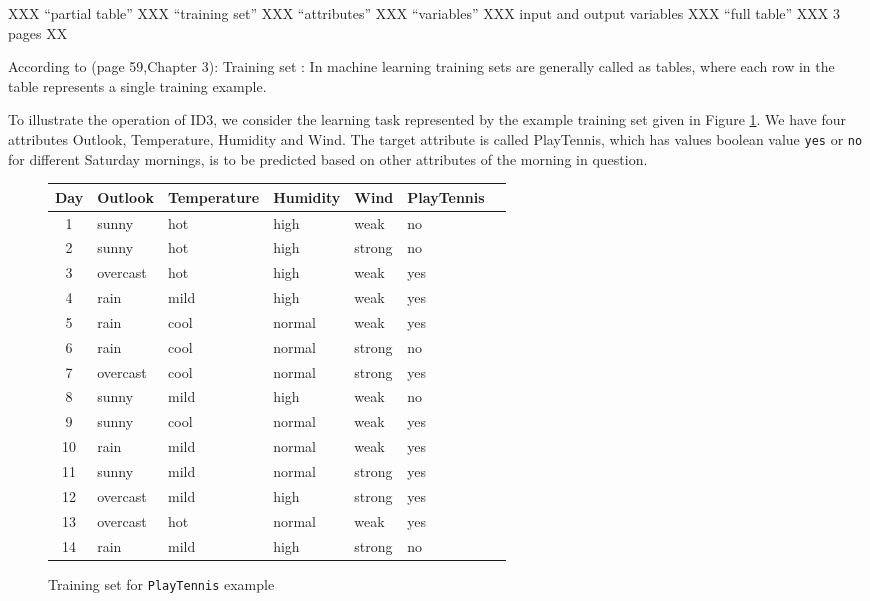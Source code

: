 \documentclass{report}
\begin{document}
XXX ``partial table'' XXX ``training set'' XXX ``attributes'' XXX ``variables'' XXX input and output variables XXX ``full table'' XXX 3 pages XX


According to \cite{Mitchell1997MachineLearning}(page 59,Chapter 3): Training set : In machine learning training sets are generally called as tables, where each row in the table represents a single training example. 

To illustrate the operation of ID3, we consider the learning task represented by the example training set given in Figure \ref{fig:trainingplaytennis}. We have four attributes Outlook, Temperature, Humidity and Wind. The target attribute is called PlayTennis, which has values boolean value \texttt{yes} or \texttt{no} for different Saturday mornings, is to be predicted based on other attributes of the morning in question.
\begin{figure}[h]
  \centering
  \begin{tabular}{|c|l|l|l|l|l|l|}
    \hline
    Day & Outlook & Temperature & Humidity & Wind & PlayTennis\\
    \hline
    1 & sunny & hot & high & weak & no
    \\\hline
    2 & sunny & hot & high & strong & no
    \\\hline
    3 & overcast & hot & high & weak & yes
    \\\hline
    4 & rain & mild & high & weak & yes
    \\\hline
    5 & rain & cool & normal & weak & yes
    \\\hline
    6 & rain & cool & normal & strong & no
    \\\hline
    7 & overcast & cool & normal & strong & yes
    \\\hline
    8 & sunny & mild & high & weak & no
    \\\hline
    9 & sunny & cool & normal & weak & yes
    \\\hline
    10 & rain & mild & normal & weak & yes
    \\\hline
    11 & sunny & mild & normal & strong & yes
    \\\hline
    12 & overcast & mild & high & strong & yes
    \\\hline
    13 & overcast & hot & normal & weak & yes
    \\\hline
    14 & rain & mild & high & strong & no
    \\\hline
  \end{tabular}
  \caption{Training set for \texttt{PlayTennis} example}
  \label{fig:trainingplaytennis}
\end{figure}
\end{document}
